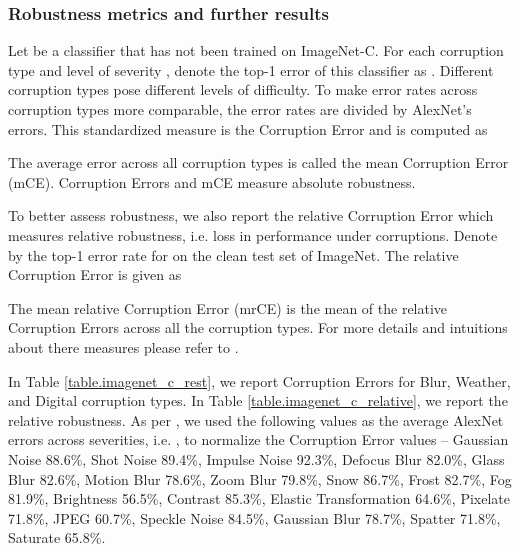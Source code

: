\documentclass{article}
\begin{document}
\subsubsection{Robustness metrics and further results} \label{sec:robust_app.results}
Let  be a classifier that has not been trained on ImageNet-C.
For each corruption type  and level of severity , denote the top-1 error of this classifier as .
Different corruption types pose different levels of difficulty. 
To make error rates across corruption types more comparable, the error rates are divided by AlexNet's errors. 
This standardized measure is the Corruption Error and is computed as 

The average error across all  corruption types is called the mean Corruption Error (mCE).
Corruption Errors and mCE measure absolute robustness.

To better assess robustness, we also report the relative Corruption Error which measures relative robustness, i.e. loss in performance under corruptions. 
Denote by  the top-1 error rate for  on the clean test set of ImageNet. 
The relative Corruption Error is given as

The mean relative Corruption Error (mrCE) is the mean of the relative Corruption Errors across all the corruption types.
For more details and intuitions about there measures please refer to \citep{hendrycks2019robustness}.

In Table \ref{table.imagenet_c_rest}, we report Corruption Errors for Blur, Weather, and Digital corruption types.
In Table \ref{table.imagenet_c_relative}, we report the relative robustness. 
As per \citep{hendrycks2019robustness}, we used the following values as the average AlexNet errors across severities, i.e. , to normalize the Corruption Error values -- 
Gaussian Noise 88.6\%, Shot Noise 89.4\%, Impulse Noise 92.3\%, Defocus Blur
82.0\%, Glass Blur 82.6\%, Motion Blur 78.6\%, Zoom Blur 79.8\%, Snow 86.7\%, Frost
82.7\%, Fog 81.9\%, Brightness 56.5\%, Contrast 85.3\%, Elastic Transformation 64.6\%,
Pixelate 71.8\%, JPEG 60.7\%, Speckle Noise 84.5\%, Gaussian Blur 78.7\%, Spatter 71.8\%,
Saturate 65.8\%.
\end{document}
